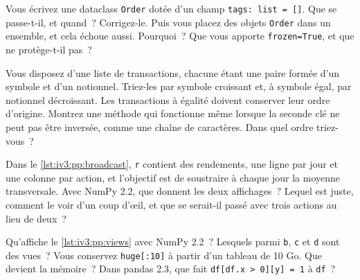 \begin{question}\label{iq:iv3:python-and-pandas:15}
Vous écrivez une dataclass \texttt{Order} dotée d'un champ \texttt{tags: list = []}. Que se passe-t-il, et quand~? Corrigez-le. Puis vous placez des objets \texttt{Order} dans un ensemble, et cela échoue aussi. Pourquoi~? Que vous apporte \texttt{frozen=True}, et que ne protège-t-il pas~?
\end{question}

\begin{question}\label{iq:iv3:python-and-pandas:16}
Vous disposez d'une liste de transactions, chacune étant une paire formée d'un symbole et d'un notionnel. Triez-les par symbole croissant et, à symbole égal, par notionnel décroissant. Les transactions à égalité doivent conserver leur ordre d'origine. Montrez une méthode qui fonctionne même lorsque la seconde clé ne peut pas être inversée, comme une chaîne de caractères. Dans quel ordre triez-vous~?
\end{question}

\begin{question}\label{iq:iv3:python-and-pandas:17}
Dans le \cref{lst:iv3:pp:broadcast}, \texttt{r} contient des rendements, une ligne par jour et une colonne par action, et l'objectif est de soustraire à chaque jour la moyenne transversale. Avec NumPy 2.2, que donnent les deux affichages~? Lequel est juste, comment le voir d'un coup d'œil, et que se serait-il passé avec trois actions au lieu de deux~?
\label{lst:iv3:pp:broadcast}
\end{question}

\begin{question}\label{iq:iv3:python-and-pandas:18}
Qu'affiche le \cref{lst:iv3:pp:views} avec NumPy 2.2~? Lesquels parmi \texttt{b}, \texttt{c} et \texttt{d} sont des vues~? Vous conservez \texttt{huge[:10]} à partir d'un tableau de 10 Go. Que devient la mémoire~? Dans pandas 2.3, que fait \texttt{df[df.x > 0][\textquotesingle y\textquotesingle] = 1} à \texttt{df}~?
\label{lst:iv3:pp:views}
\end{question}


